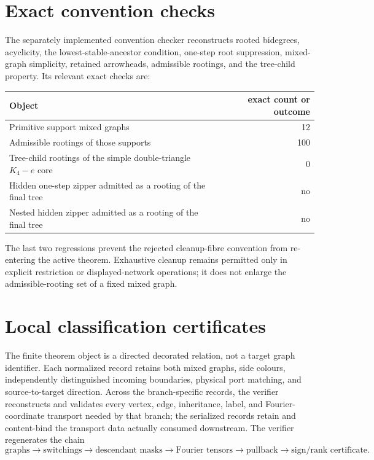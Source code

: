 \documentclass[11pt]{article}
\begin{document}
\section{Exact convention checks}

The separately implemented convention checker reconstructs rooted bidegrees,
acyclicity, the lowest-stable-ancestor condition, one-step root suppression,
mixed-graph simplicity, retained arrowheads, admissible rootings, and the
tree-child property.  Its relevant exact checks are:

\begin{center}
\begin{tabular}{lr}
\toprule
Object & exact count or outcome\\
\midrule
Primitive support mixed graphs & 12\\
Admissible rootings of those supports & 100\\
Tree-child rootings of the simple double-triangle $K_4-e$ core & 0\\
Hidden one-step zipper admitted as a rooting of the final tree & no\\
Nested hidden zipper admitted as a rooting of the final tree & no\\
\bottomrule
\end{tabular}
\end{center}

The last two regressions prevent the rejected cleanup-fibre convention from
re-entering the active theorem.  Exhaustive cleanup remains permitted only in
explicit restriction or displayed-network operations; it does not enlarge
the admissible-rooting set of a fixed mixed graph.

\section{Local classification certificates}

The finite theorem object is a directed decorated relation, not a target
graph identifier.  Each normalized record retains both mixed graphs, side
colours, independently distinguished incoming boundaries, physical port
matching, and source-to-target direction.  Across the branch-specific
records, the verifier reconstructs and validates every vertex, edge,
inheritance, label, and Fourier-coordinate transport needed by that branch;
the serialized records retain and content-bind the transport data actually
consumed downstream.  The verifier regenerates the chain
\[
\text{graphs}\to\text{switchings}\to\text{descendant masks}
\to\text{Fourier tensors}\to\text{pullback}\to\text{sign/rank certificate}.
\]
\end{document}

